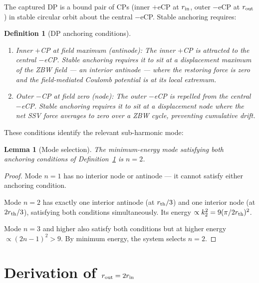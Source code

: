 \documentclass[12pt]{article}
\newtheorem{definition}[theorem]{Definition}
\newtheorem{lemma}[theorem]{Lemma}
\newcommand{\rth}{r_{\rm th}}
\newcommand{\rin}{r_{\rm in}}
\newcommand{\rout}{r_{\rm out}}
\begin{document}
The captured DP is a bound pair of CPs (inner $+$eCP at $\rin$, outer
$-$eCP at $\rout$) in stable circular orbit about the central $-$eCP.
Stable anchoring requires:

\begin{definition}[DP anchoring conditions]
\label{def:anchor}
\quad
\begin{enumerate}[noitemsep]
  \item \emph{Inner $+$CP at field maximum (antinode):} The inner
    $+$CP is attracted to the central $-$eCP.  Stable anchoring
    requires it to sit at a displacement maximum of the ZBW field
    --- an interior antinode --- where the restoring force is zero
    and the field-mediated Coulomb potential is at its local
    extremum.
  \item \emph{Outer $-$CP at field zero (node):} The outer $-$eCP
    is repelled from the central $-$eCP.  Stable anchoring requires
    it to sit at a displacement node where the net SSV force
    averages to zero over a ZBW cycle, preventing cumulative drift.
\end{enumerate}
\end{definition}

These conditions identify the relevant sub-harmonic mode:

\begin{lemma}[Mode selection]
\label{lem:mode_select}
The minimum-energy mode satisfying both anchoring conditions of
Definition~\ref{def:anchor} is $n = 2$.
\end{lemma}

\begin{proof}
Mode $n=1$ has no interior node or antinode --- it cannot satisfy
either anchoring condition.

Mode $n=2$ has exactly one interior antinode (at $\rth/3$) and
one interior node (at $2\rth/3$), satisfying both conditions
simultaneously.  Its energy $\propto k_2^2 = 9(\pi/2\rth)^2$.

Mode $n=3$ and higher also satisfy both conditions but at higher
energy $\propto (2n-1)^2 > 9$.  By minimum energy, the system
selects $n=2$.
\end{proof}

\section{Derivation of $\rout = 2\rin$}
\label{sec:derivation}
\end{document}
